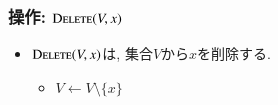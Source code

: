 \documentclass[main]{subfiles}
\begin{document}
\begin{frame}\frametitle{操作: $\mathrm{\text{D\textsc{elete}}}(V,x)$}
\begin{itemize}
	\item $\mathrm{\text{D\textsc{elete}}}(V,x)$は, 集合$V$から$x$を削除する.\\
	\begin{itemize} \item $V \gets V \setminus \{x\}$ \end{itemize}
\end{itemize}

\begin{columns}[c]
	\begin{column}{0.5\linewidth}
		
	\end{column}
	\begin{column}{0.49\linewidth}
		
	\end{column}
\end{columns}
\end{frame}
\end{document}
